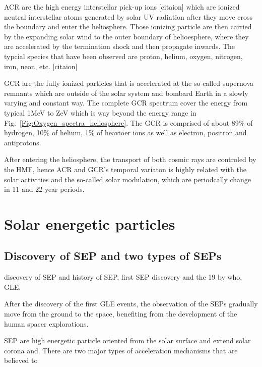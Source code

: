 \acs{ACR} are the high energy interstellar pick-up ions [citaion] which are ionized neutral interstellar atoms generated by solar UV radiation after they move cross the boundary and enter the heliosphere. Those ionizing particle are then carried by the expanding solar wind to the outer boundary of helioesphere, where they are accelerated by the termination shock and then propagate inwards. The typcial species that have been observed are proton, helium, oxygen, nitrogen, iron, neon, etc. [citaion]

\ac{GCR} are the fully ionized particles that is accelerated at the so-called supernova remnants \cite{Blasi2013AARv2013} which are outside of the solar system and bombard Earth in a slowly varying and constant way. The complete GCR spectrum cover the energy from typical 1MeV \cite{Potgieter2013LRSP} to ZeV which is way beyond the energy range in Fig.~\ref{Fig:Oxygen_spectra_heliosphere}. The \acs{GCR} is comprised of about 89\% of hydrogen, 10\% of helium, 1\% of heavioer ions as well as electron, positron and antiprotons. 

After entering the heliosphere, the transport of both cosmic rays are controled by the \ac{HMF}, hence \ac{ACR} and \ac{GCR}'s temporal variaton is highly related with the solar activities and the so-called solar modulation, which are periodcally change in 11 and 22 year periods. 


\section{Solar energetic particles}
\subsection{Discovery of SEP and two types of SEPs}
discovery of SEP and history of SEP, first SEP discovery and the  19 by who, GLE.

After the discovery of the first GLE events, the observation of the SEPs gradually move from the ground to the space, benefiting from the development of the human spacer explorations.

SEP are high energetic particle oriented from the solar surface and extend solar corona and. There are two major types of acceleration mechanisms that are believed to 


